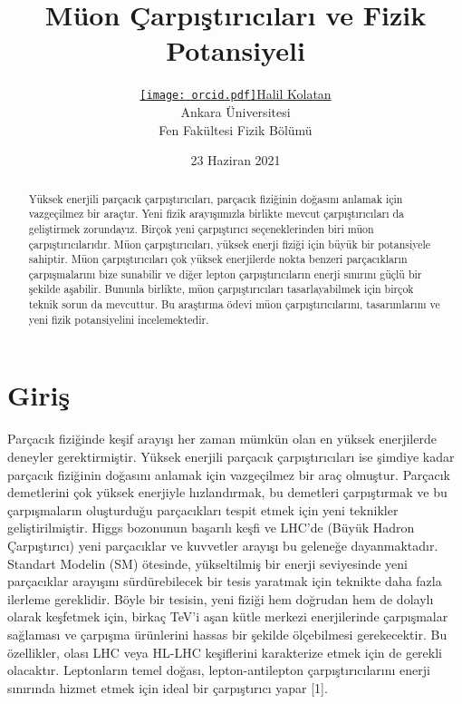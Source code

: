 \documentclass{article}
\title{Müon Çarpıştırıcıları ve Fizik Potansiyeli}
\author{ \href{https://orcid.org/0000-0002-1684-9602}{\texttt{[image: orcid.pdf]}\hspace{1mm}Halil Kolatan} \\
	Ankara Üniversitesi\\
	Fen Fakültesi 
	Fizik Bölümü }\\
\date{23 Haziran 2021}
\begin{document}
\maketitle


\begin{abstract}
Yüksek enerjili parçacık çarpıştırıcıları, parçacık fiziğinin doğasını anlamak için vazgeçilmez bir araçtır. Yeni fizik arayışımızla birlikte mevcut çarpıştırıcıları da geliştirmek zorundayız. Birçok yeni çarpıştırıcı seçeneklerinden biri müon çarpıştırıcılarıdır. Müon çarpıştırıcıları, yüksek enerji fiziği için büyük bir potansiyele sahiptir. Müon çarpıştırıcıları çok yüksek enerjilerde nokta benzeri parçacıkların çarpışmalarını bize sunabilir ve diğer lepton çarpıştırıcıların enerji sınırını güçlü bir şekilde aşabilir. Bununla birlikte, müon çarpıştırıcıları tasarlayabilmek için birçok teknik sorun da mevcuttur. Bu araştırma ödevi müon çarpıştırıcılarını, tasarımlarını ve yeni fizik potansiyelini incelemektedir.
\end{abstract}



\section{Giriş}

 Parçacık fiziğinde keşif arayışı her zaman mümkün olan en yüksek enerjilerde deneyler gerektirmiştir. Yüksek enerjili parçacık çarpıştırıcıları ise şimdiye kadar parçacık fiziğinin doğasını anlamak için vazgeçilmez bir araç olmuştur. Parçacık demetlerini çok yüksek enerjiyle hızlandırmak, bu demetleri çarpıştırmak ve bu çarpışmaların oluşturduğu parçacıkları tespit etmek için yeni teknikler geliştirilmiştir. Higgs bozonunun başarılı keşfi ve LHC'de (Büyük Hadron Çarpıştırıcı) yeni parçacıklar ve kuvvetler arayışı bu geleneğe dayanmaktadır. Standart Modelin (SM) ötesinde, yükseltilmiş bir enerji seviyesinde yeni parçacıklar arayışını sürdürebilecek bir tesis yaratmak için teknikte daha fazla ilerleme gereklidir. Böyle bir tesisin, yeni fiziği hem doğrudan hem de dolaylı olarak keşfetmek için, birkaç TeV'i aşan kütle merkezi enerjilerinde çarpışmalar sağlaması ve çarpışma ürünlerini hassas bir şekilde ölçebilmesi gerekecektir. Bu özellikler, olası LHC veya HL-LHC keşiflerini karakterize etmek için de gerekli olacaktır. Leptonların temel doğası, lepton-antilepton çarpıştırıcılarını enerji sınırında hizmet etmek için ideal bir çarpıştırıcı yapar [1].
 
\end{document}
